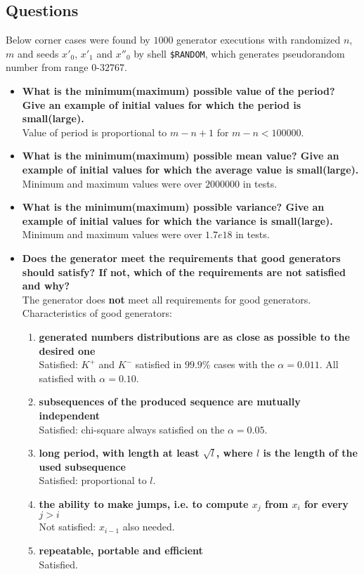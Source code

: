 \documentclass[a4paper,10pt]{article}
\begin{document}
\subsection{Questions}
Below corner cases were found by $1000$ generator executions with randomized $n$, $m$ and seeds ${x'_0}$, ${x'_1}$ and ${x''_0}$ by shell \texttt{\$RANDOM}, which generates pseudorandom number from range $0$-$32767$.
\begin{itemize}
 \item \textbf{What is the minimum(maximum) possible value of the period? Give an example of initial values for which the period is small(large).} \\ 
Value of period is proportional to $m-n + 1$ for $m-n<100000$.

 \item \textbf{What is the minimum(maximum) possible mean value? Give an example of initial values for which the average value is small(large).} \\
Minimum and maximum values were over $2000000$ in tests.
 
 \item \textbf{What is the minimum(maximum) possible variance? Give an example of initial values for which the variance is small(large).} \\
Minimum and maximum values were over $1.7e18$ in tests.

 \item \textbf{Does the generator meet the requirements that good generators should satisfy? If not, which of the requirements are not satisfied and why?} \\
  The generator does \textbf{not} meet all requirements for good generators. \\
  Characteristics of good generators:
   \begin{enumerate}
    \item \textbf{generated numbers distributions are as close as possible to the desired one} \\
    Satisfied: $K^+$ and $K^-$ satisfied in $99.9\%$ cases with the $\alpha = 0.011$. All satisfied with $\alpha = 0.10$.
    \item \textbf{subsequences of the produced sequence are mutually independent} \\
    Satisfied: chi-square always satisfied on the $\alpha = 0.05$.
    \item \textbf{long period, with length at least $\sqrt{l}$, where $l$ is the length of the used subsequence} \\
    Satisfied: proportional to $l$.
    \item \textbf{the ability to make jumps, i.e. to compute $x_j$ from $x_i$ for every $j > i$} \\
    Not satisfied: $x_{i-1}$ also needed.
    \item \textbf{repeatable, portable and efficient} \\
    Satisfied.
   \end{enumerate}
 

\end{itemize}
\end{document}
